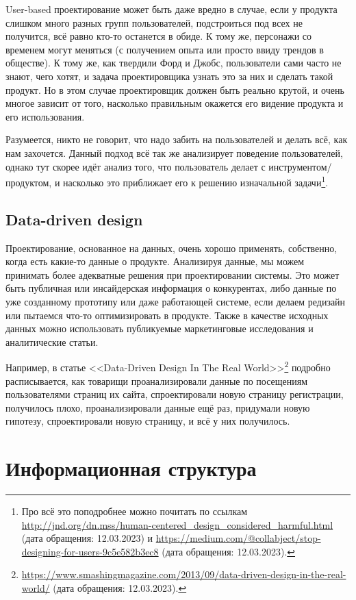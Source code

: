 \documentclass{../../text-style}
\begin{document}
User-based проектирование может быть даже вредно в случае, если у продукта слишком много разных групп пользователей, подстроиться под всех не получится, всё равно кто-то останется в обиде. К тому же, персонажи со временем могут меняться (с получением опыта или просто ввиду трендов в обществе). К тому же, как твердили Форд и Джобс, пользователи сами часто не знают, чего хотят, и задача проектировщика узнать это за них и сделать такой продукт. Но в этом случае проектировщик должен быть реально крутой, и очень многое зависит от того, насколько правильным окажется его видение продукта и его использования.

Разумеется, никто не говорит, что надо забить на пользователей и делать всё, как нам захочется. Данный подход всё так же анализирует поведение пользователей, однако тут скорее идёт анализ того, что пользователь делает с инструментом/продуктом, и насколько это приближает его к решению изначальной задачи\footnote{Про всё это поподробнее можно почитать по ссылкам \url{http://jnd.org/dn.mss/human-centered_design_considered_harmful.html} (дата обращения: 12.03.2023) и \url{https://medium.com/@collabject/stop-designing-for-users-9c5e582b3ec8} (дата обращения: 12.03.2023).}.

\subsection{Data-driven design}

Проектирование, основанное на данных, очень хорошо применять, собственно, когда есть какие-то данные о продукте. Анализируя данные, мы можем принимать более адекватные решения при проектировании системы. Это может быть публичная или инсайдерская информация о конкурентах, либо данные по уже созданному прототипу или даже работающей системе, если делаем редизайн или пытаемся что-то оптимизировать в продукте. Также в качестве исходных данных можно использовать публикуемые маркетинговые исследования и аналитические статьи.

Например, в статье <<Data-Driven Design In The Real World>>\footnote{\url{https://www.smashingmagazine.com/2013/09/data-driven-design-in-the-real-world/} (дата обращения: 12.03.2023).} подробно расписывается, как товарищи проанализировали данные по посещениям пользователями страниц их сайта, спроектировали новую страницу регистрации, получилось плохо, проанализировали данные ещё раз, придумали новую гипотезу, спроектировали новую страницу, и всё у них получилось.

\section{Информационная структура}
\end{document}
